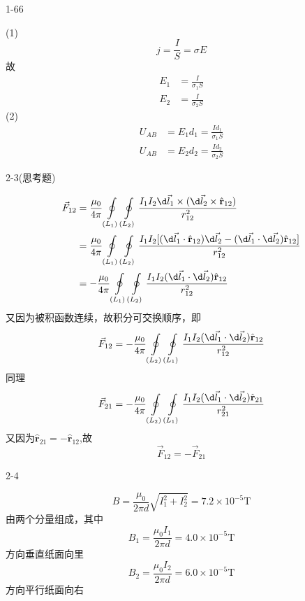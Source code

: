 \documentclass{phyasgn}
\begin{document}
{\heiti\color{red} 1-66}
\begin{sol}
    (1)$$j=\frac{I}{S}=\sigma E$$故
    $$\begin{aligned}
        E_1&=\frac{I}{\sigma_1 S}\\
        E_2&=\frac{I}{\sigma_2 S}
    \end{aligned}$$
    (2)$$\begin{aligned}
        U_{AB}&=E_1d_1=\frac{Id_1}{\sigma_1 S}\\
        U_{AB}&=E_2d_2=\frac{Id_2}{\sigma_2 S}
    \end{aligned}$$
\end{sol}\par

{\heiti\color{red} 2-3(思考题)}
\begin{sol}
    $$\begin{aligned}
        \vec{F}_{12}&=\frac{\mu_0}{4\pi}\oint\limits_{(L_1)}\oint\limits_{(L_2)}\frac{I_1I_2\d \vec{l}_1\times (\d \vec{l}_2\times\hat{\mathbf{r}}_{12})}{r_{12}^2}\\
        &=\frac{\mu_0}{4\pi}\oint\limits_{(L_1)}\oint\limits_{(L_2)}\frac{I_1I_2[(\d \vec{l}_1\cdot \hat{\mathbf{r}}_{12})\d \vec{l}_2-(\d \vec{l}_1\cdot \d \vec{l}_2)\hat{\mathbf{r}}_{12}]}{r_{12}^2}\\
        &=-\frac{\mu_0}{4\pi}\oint\limits_{(L_1)}\oint\limits_{(L_2)}\frac{I_1I_2(\d \vec{l}_1\cdot \d \vec{l}_2)\hat{\mathbf{r}}_{12}}{r_{12}^2}
    \end{aligned}$$
    又因为被积函数连续，故积分可交换顺序，即
    $$\vec{F}_{12}=-\frac{\mu_0}{4\pi}\oint\limits_{(L_2)}\oint\limits_{(L_1)}\frac{I_1I_2(\d \vec{l}_1\cdot \d \vec{l}_2)\hat{\mathbf{r}}_{12}}{r_{12}^2}$$
    同理
    $$\vec{F}_{21}=-\frac{\mu_0}{4\pi}\oint\limits_{(L_2)}\oint\limits_{(L_1)}\frac{I_1I_2(\d \vec{l}_1\cdot \d \vec{l}_2)\hat{\mathbf{r}}_{21}}{r_{21}^2}$$
    又因为$\hat{\mathbf{r}}_{21}=-\hat{\mathbf{r}}_{12}$,故
    $$\vec{F}_{12}=-\vec{F}_{21}$$
\end{sol}\par

{\heiti\color{red} 2-4}
\begin{sol}
    $$B=\frac{\mu_0}{2\pi d}\sqrt{I_1^2+I_2^2}=7.2\times 10^{-5}\text{T}$$
    由两个分量组成，其中
    $$B_1=\frac{\mu_0I_1}{2\pi d}=4.0\times 10^{-5}\text{T}$$
    方向垂直纸面向里
    $$B_2=\frac{\mu_0I_2}{2\pi d}=6.0\times 10^{-5}\text{T}$$
    方向平行纸面向右
\end{sol}\par
\end{document}
